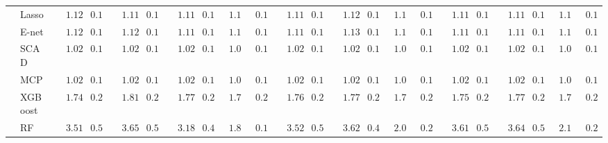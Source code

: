 \begin{tabular}{ll|ll|llllll|llllll|llllll}
 & Lasso  & $\phantom{00}1.12$ & $\phantom{0}0.13$ & $\phantom{00}1.11$ & $\phantom{0}0.13$ & $\phantom{00}1.11$ & $\phantom{0}0.14$ & $\phantom{0}1.12$ & $\phantom{0}0.13$ & $\phantom{00}1.11$ & $\phantom{0}0.12$ & $\phantom{00}1.12$ & $\phantom{0}0.13$ & $\phantom{0}1.12$ & $\phantom{0}0.13$ & $\phantom{00}1.11$ & $\phantom{0}0.12$ & $\phantom{00}1.11$ & $\phantom{0}0.14$ & $\phantom{0}1.12$ & $\phantom{0}0.13$ \\
 & E-net  & $\phantom{00}1.12$ & $\phantom{0}0.13$ & $\phantom{00}1.12$ & $\phantom{0}0.13$ & $\phantom{00}1.11$ & $\phantom{0}0.14$ & $\phantom{0}1.12$ & $\phantom{0}0.13$ & $\phantom{00}1.11$ & $\phantom{0}0.12$ & $\phantom{00}1.13$ & $\phantom{0}0.13$ & $\phantom{0}1.12$ & $\phantom{0}0.13$ & $\phantom{00}1.11$ & $\phantom{0}0.13$ & $\phantom{00}1.11$ & $\phantom{0}0.14$ & $\phantom{0}1.13$ & $\phantom{0}0.13$ \\
 & SCAD  & $\phantom{00}1.02$ & $\phantom{0}0.10$ & $\phantom{00}1.02$ & $\phantom{0}0.10$ & $\phantom{00}1.02$ & $\phantom{0}0.11$ & $\phantom{0}1.03$ & $\phantom{0}0.11$ & $\phantom{00}1.02$ & $\phantom{0}0.10$ & $\phantom{00}1.02$ & $\phantom{0}0.10$ & $\phantom{0}1.04$ & $\phantom{0}0.11$ & $\phantom{00}1.02$ & $\phantom{0}0.10$ & $\phantom{00}1.02$ & $\phantom{0}0.11$ & $\phantom{0}1.04$ & $\phantom{0}0.11$ \\
 & MCP  & $\phantom{00}1.02$ & $\phantom{0}0.11$ & $\phantom{00}1.02$ & $\phantom{0}0.11$ & $\phantom{00}1.02$ & $\phantom{0}0.11$ & $\phantom{0}1.03$ & $\phantom{0}0.11$ & $\phantom{00}1.02$ & $\phantom{0}0.10$ & $\phantom{00}1.02$ & $\phantom{0}0.11$ & $\phantom{0}1.04$ & $\phantom{0}0.10$ & $\phantom{00}1.02$ & $\phantom{0}0.10$ & $\phantom{00}1.02$ & $\phantom{0}0.11$ & $\phantom{0}1.04$ & $\phantom{0}0.11$ \\
 & XGBoost  & $\phantom{00}1.74$ & $\phantom{0}0.24$ & $\phantom{00}1.81$ & $\phantom{0}0.24$ & $\phantom{00}1.77$ & $\phantom{0}0.28$ & $\phantom{0}1.71$ & $\phantom{0}0.24$ & $\phantom{00}1.76$ & $\phantom{0}0.26$ & $\phantom{00}1.77$ & $\phantom{0}0.25$ & $\phantom{0}1.76$ & $\phantom{0}0.28$ & $\phantom{00}1.75$ & $\phantom{0}0.22$ & $\phantom{00}1.77$ & $\phantom{0}0.23$ & $\phantom{0}1.73$ & $\phantom{0}0.24$ \\
 & RF  & $\phantom{00}3.51$ & $\phantom{0}0.53$ & $\phantom{00}3.65$ & $\phantom{0}0.52$ & $\phantom{00}3.18$ & $\phantom{0}0.41$ & $\phantom{0}1.81$ & $\phantom{0}0.19$ & $\phantom{00}3.52$ & $\phantom{0}0.51$ & $\phantom{00}3.62$ & $\phantom{0}0.47$ & $\phantom{0}2.02$ & $\phantom{0}0.24$ & $\phantom{00}3.61$ & $\phantom{0}0.53$ & $\phantom{00}3.64$ & $\phantom{0}0.51$ & $\phantom{0}2.14$ & $\phantom{0}0.22$ \\

\end{tabular}
